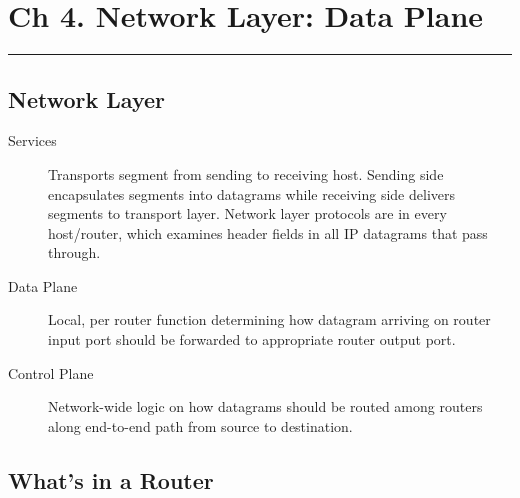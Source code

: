 \documentclass{article}
\begin{document}
\section*{Ch 4. Network Layer: Data Plane}
\noindent
\rule{\linewidth}{0.5mm}
\noindent

\subsection*{Network Layer}

\begin{description}
    \item[Services] Transports segment from sending to receiving host. Sending side encapsulates 
    segments into datagrams while receiving side delivers segments to transport layer. Network layer
    protocols are in every host/router, which examines header fields in all IP datagrams that pass through.
    
    \item[Data Plane] Local, per router function determining how datagram arriving on router input 
    port should be forwarded to appropriate router output port.
    
    \item[Control Plane] Network-wide logic on how datagrams should be routed among routers along
    end-to-end path from source to destination. 
\end{description}

\subsection*{What's in a Router}
\end{document}
